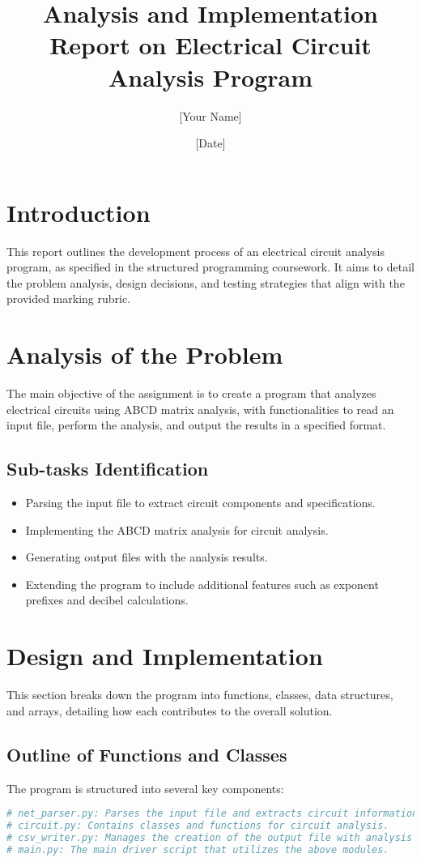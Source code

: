 \documentclass{article}
\title{Analysis and Implementation Report on Electrical Circuit Analysis Program}
\author{[Your Name]}
\date{[Date]}
\begin{document}
\maketitle

\section{Introduction}
This report outlines the development process of an electrical circuit analysis program, as specified 
in the structured programming coursework. It aims to detail the problem analysis, design decisions, 
and testing strategies that align with the provided marking rubric.

\section{Analysis of the Problem}
The main objective of the assignment is to create a program that analyzes 
electrical circuits using ABCD matrix analysis, with functionalities to read an 
input file, perform the analysis, and output the results in a specified format.

\subsection{Sub-tasks Identification}
\begin{itemize}
    \item Parsing the input file to extract circuit components and specifications.
    \item Implementing the ABCD matrix analysis for circuit analysis.
    \item Generating output files with the analysis results.
    \item Extending the program to include additional features such as exponent prefixes and decibel calculations.
\end{itemize}

\section{Design and Implementation}
This section breaks down the program into functions, classes, data structures, and arrays, detailing how each contributes to the overall solution.

\subsection{Outline of Functions and Classes}
The program is structured into several key components:
\begin{lstlisting}[language=Python]
# net_parser.py: Parses the input file and extracts circuit information.
# circuit.py: Contains classes and functions for circuit analysis.
# csv_writer.py: Manages the creation of the output file with analysis results.
# main.py: The main driver script that utilizes the above modules.
\end{lstlisting}
\end{document}
